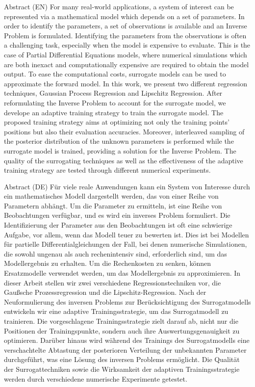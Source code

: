 \begin{abstractBox}[colbacktitle=black]{Abstract (EN)}{
    For many real-world applications, a system of interest can be represented via a mathematical model which depends on a set of parameters. 
    In order to identify the parameters, a set of observations is available and an Inverse Problem is formulated. 
    Identifying the parameters from the observations is often a challenging task, especially when the model is expensive to evaluate. 
    This is the case of Partial Differential Equations models, where numerical simulations which are both inexact and computationally expensive are required to obtain the model output. 
    To ease the computational costs, surrogate models can be used to approximate the forward model. 
    In this work, we present two different regression techniques, Gaussian Process Regression and Lipschitz Regression. 
    After reformulating the Inverse Problem to account for the surrogate model, we develope an adaptive training strategy to train the surrogate model. 
    The proposed training strategy aims at optimizing not only the training points' positions but also their evaluation accuracies.
    Moreover, interleaved sampling of the posterior distribution of the unknown parameters is performed while the surrogate model is trained, providing a solution for the Inverse Problem.
    The quality of the surrogating techniques as well as the effectiveness of the adaptive training strategy are tested through different numerical experiments.
}
\end{abstractBox}
\begin{abstractBox}[colbacktitle=black]{Abstract (DE)}{
    Für viele reale Anwendungen kann ein System von Interesse durch ein mathematisches Modell dargestellt werden, das von einer Reihe von Parametern abhängt. 
    Um die Parameter zu ermitteln, ist eine Reihe von Beobachtungen verfügbar, und es wird ein inverses Problem formuliert. 
    Die Identifizierung der Parameter aus den Beobachtungen ist oft eine schwierige Aufgabe, vor allem, wenn das Modell teuer zu bewerten ist. 
    Dies ist bei Modellen für partielle Differentialgleichungen der Fall, bei denen numerische Simulationen, die sowohl ungenau als auch rechenintensiv sind, erforderlich sind, um das Modellergebnis zu erhalten. 
    Um die Rechenkosten zu senken, können Ersatzmodelle verwendet werden, um das Modellergebnis zu approximieren. 
    In dieser Arbeit stellen wir zwei verschiedene Regressionstechniken vor, die Gaußsche Prozessregression und die Lipschitz-Regression. 
    Nach der Neuformulierung des inversen Problems zur Berücksichtigung des Surrogatmodells entwickeln wir eine adaptive Trainingsstrategie, um das Surrogatmodell zu trainieren. 
    Die vorgeschlagene Trainingsstrategie zielt darauf ab, nicht nur die Positionen der Trainingspunkte, sondern auch ihre Auswertungsgenauigkeit zu optimieren.
    Darüber hinaus wird während des Trainings des Surrogatmodells eine verschachtelte Abtastung der posterioren Verteilung der unbekannten Parameter durchgeführt, was eine Lösung des inversen Problems ermöglicht.
    Die Qualität der Surrogattechniken sowie die Wirksamkeit der adaptiven Trainingsstrategie werden durch verschiedene numerische Experimente getestet.
    }
    \end{abstractBox}
\vspace{.5cm}